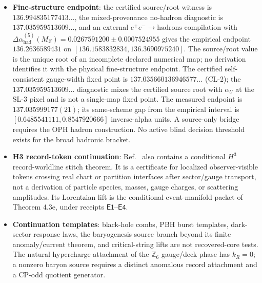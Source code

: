 \begin{itemize}
These values hold on their named charts and carry no promoted complex-pole receipt. The reciprocal-ray quark candidate
fails on common-scale dimensionless
Yukawas, and the exact generic interface has six scalar coordinates. The mixed-convention
residual chart has no prediction status and is fit better by its lower-order ablation. The particle simulator has no Yukawa coupling or Yukawa information, and
generation-blind flavor-singlet data do not select a physical flavor orbit. No nonzero
source-only physical mass is emitted in the electroweak, charged-lepton, quark, or neutrino
lanes. The symmetry-protected massless Maxwell, perturbative Yang--Mills, and Einstein kernels
remain classical action statements until their quantum-pole gates pass.
\item \textbf{Fine-structure endpoint}: the certified source/root witness is
\(136.994835177413\ldots\), the mixed-provenance no-hadron diagnostic is
\(137.035959513609\ldots\), and an external \(e^+e^-\to\mathrm{hadrons}\) compilation with
\(\Delta\alpha_{\mathrm{had}}^{(5)}(M_Z)=0.0267591200\pm0.0007524955\) gives the empirical
endpoint \(136.2636589431\) on \([136.1583832834,136.3690975240]\). The
source/root value is the unique root of an incomplete declared numerical map; no derivation identifies it with the physical
fine-structure endpoint. The certified
self-consistent gauge-width fixed point is \(137.035660136946577\ldots\) (CL-2); the
\(137.035959513609\ldots\) diagnostic mixes the certified source root with
\(\alpha_U\) at the SL-3 pixel and is not a single-map fixed point.
The measured endpoint is
\(137.035999177(21)\); its same-scheme gap from the empirical interval is
\([0.6485541111,0.8547920666]\) inverse-alpha units. A source-only bridge requires the OPH
hadron construction. No active blind decision threshold exists for the broad hadronic bracket.
\item \textbf{H3 record-token continuation}: Ref.~\cite{ophparticles} also contains a conditional
\(H^3\) record-worldline stitch theorem. It is a certificate for localized observer-visible tokens
crossing real chart or partition interfaces after sector/gauge transport, not a derivation of
particle species, masses, gauge charges, or scattering amplitudes. Its Lorentzian lift is the
conditional event-manifold packet of Theorem 4.3e, under receipts \(\mathsf{E1}\)--\(\mathsf{E4}\).
\item \textbf{Continuation templates}: black-hole combs, PBH burst templates, dark-sector
response laws, the baryogenesis source branch beyond its finite anomaly/current theorem, and critical-string lifts are not recovered-core tests. The natural hypercharge attachment of the \(\mathbb Z_6\) gauge/deck phase has \(k_R=0\); a nonzero baryon source requires a distinct anomalous record attachment and a CP-odd quotient generator.
\end{itemize}

